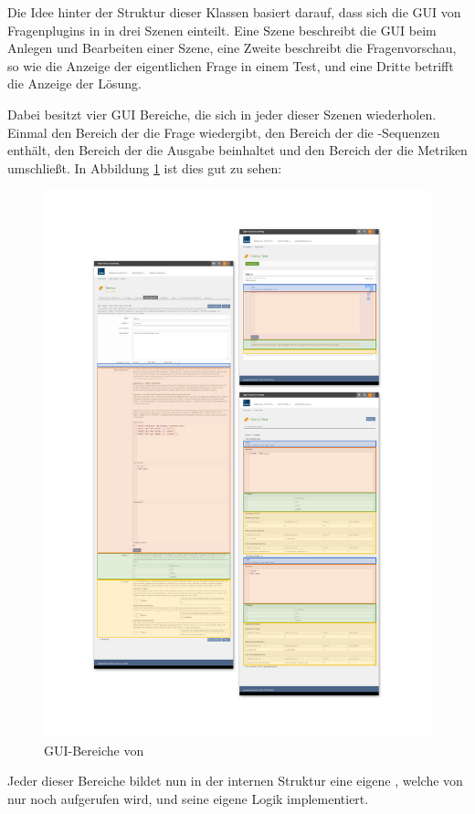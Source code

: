 Die Idee hinter der Struktur dieser Klassen basiert darauf, dass sich die GUI von Fragenplugins in  in drei Szenen einteilt. Eine Szene beschreibt die GUI beim Anlegen und Bearbeiten einer Szene, eine Zweite beschreibt die Fragenvorschau, so wie die Anzeige der eigentlichen Frage in einem Test, und eine Dritte betrifft die Anzeige der Lösung.

Dabei besitzt  vier GUI Bereiche, die sich in jeder dieser Szenen wiederholen. Einmal den Bereich der die Frage wiedergibt, den Bereich der die -Sequenzen enthält, den Bereich der die Ausgabe beinhaltet und den Bereich der die Metriken umschließt. In Abbildung \ref{fig:gui-bereiche} ist dies gut zu sehen:

    \begin{figure}[H]
        \begin{center}
            \includegraphics[page=1, width=0.3\paperwidth, trim=4 4 4 4, clip]{fig/GUIAreas.pdf} 
            \caption{GUI-Bereiche von }
            \label{fig:gui-bereiche}
        \end{center}
    \end{figure}
    
Jeder dieser Bereiche bildet nun in der internen Struktur eine eigene , welche von  nur noch aufgerufen wird, und seine eigene Logik implementiert. 





